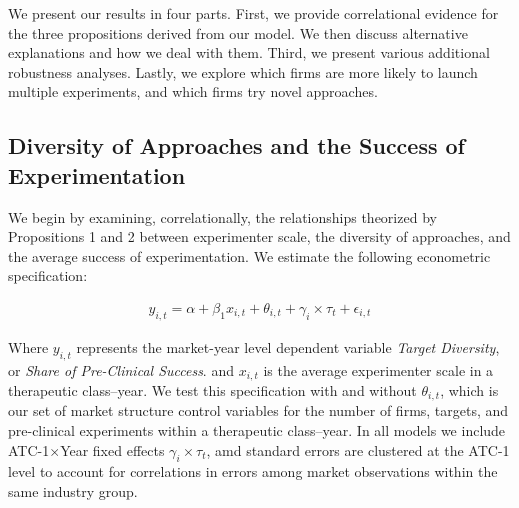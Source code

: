 

We present our results in four parts. First, we provide correlational evidence for the three propositions derived from our model. We then discuss alternative explanations and how we deal with them. Third, we present various additional robustness analyses. Lastly, we explore which firms are more likely to launch multiple experiments, and which firms try novel approaches.


\subsection{Diversity of Approaches and the Success of Experimentation}


We begin by examining, correlationally, the relationships theorized by Propositions 1 and 2 between experimenter scale, the diversity of approaches, and the average success of experimentation. We estimate the following econometric specification:


\begin{equation}
\label{eq:baseline_model}
\begin{aligned}
        y_{i, t} = \alpha + \beta_1{x_{i, t}} + \theta_{i, t} + \gamma_i\times\tau_t + \epsilon_{i, t}
\end{aligned}
\end{equation}

Where $y_{i, t}$ represents the market-year level dependent variable \emph{Target Diversity}, or \emph{Share of Pre-Clinical Success}. and $x_{i, t}$ is the average experimenter scale in a therapeutic class--year. We test this specification with and without $\theta_{i, t}$, which is our set of market structure control variables for the number of firms, targets, and pre-clinical experiments within a therapeutic class–year. In all models we include ATC-1$\times$Year fixed effects $\gamma_i\times\tau_t$, amd standard errors are clustered at the ATC-1 level to account for correlations in errors among market observations within the same industry group.

